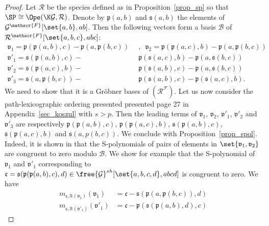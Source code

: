 \begin{proof}
Let $\mathcal{R}$ be the species defined as in Proposition~\ref{prop_sp} so that 
$\SP\cong\Ope(\K\mathcal{G},\mathcal{R})$. Denote by $\mathfrak{p}(a,b)$ and $\mathfrak{s}(a,b)$ the 
elements of $\mathcal{G}^{\mathscr{F}}[\set{a,b},ab]$. Then the following vectors form a basis 
$\mathcal{B}$ of $\mathcal{R}^{\mathscr{F}}[\set{a,b,c},abc]$:
\begin{align}
    \mathfrak{v}_1 =\mathfrak{p}(\mathfrak{p}(a,b),c) - \mathfrak{p}(a,\mathfrak{p}(b,c))  \enspace &,\enspace 
    \mathfrak{v}_2=\mathfrak{p}(\mathfrak{p}(a,c),b) - \mathfrak{p}(a,\mathfrak{p}(b,c))\label{vec_points}\\
    \mathfrak{v'}_1=\mathfrak{s}(\mathfrak{p}(a,b),c) - &\mathfrak{p}(\mathfrak{s}(a,c),b) - \mathfrak{p}(a,\mathfrak{s}(b,c)) \label{vec_seg1} \\
    \mathfrak{v'}_2=\mathfrak{s}(\mathfrak{p}(a,c),b) - &\mathfrak{p}(\mathfrak{s}(a,b),c) - \mathfrak{p}(a, \mathfrak{s}(b,c))  \label{vec_seg2}\\
    \mathfrak{v'}_3=\mathfrak{s}(a,\mathfrak{p}(b,c)) - &\mathfrak{p}(\mathfrak{s}(a,b),c) - \mathfrak{p}(\mathfrak{s}(a,c),b).\label{vec_seg3}
\end{align}
We need to show that it is a Gröbner bases of $(\mathcal{R}^{\mathscr{F}})$. Let us now consider the 
path-lexicographic ordering presented presented page 27 in Appendix~\ref{sec_koszul} with $s>p$. Then the leading terms 
of $\mathfrak{v}_1$, $\mathfrak{v}_2$, $\mathfrak{v'}_1$, $\mathfrak{v'}_2$ and $\mathfrak{v'}_3$ are 
respectively $\mathfrak{p}(\mathfrak{p}(a,b),c)$, $\mathfrak{p}(\mathfrak{p}(a,c),b)$, 
$\mathfrak{s}(\mathfrak{p}(a,b),c)$, $\mathfrak{s}(\mathfrak{p}(a,c),b)$ and $\mathfrak{s}(a,p(b,c))$. 
We conclude with Proposition~\ref{prop_spol}. Indeed, it is shown in \cite{DK10} that the S-polynomials of 
pairs of elements in $\set{\mathfrak{v}_1,\mathfrak{v}_2}$ are congruent to zero modulo $\mathcal{B}$. We 
show for example that the S-polynomial of $\mathfrak{v}_1$ and $\mathfrak{v'}_1$ corresponding to 
$\mathfrak{c}=\mathfrak{s}(\mathfrak{p}(\mathfrak{p}(a,b),c),d)\in\free{\mathcal{G}}^{sh}[\set{a,b,c,d},abcd]$ is congruent to zero. We have
\begin{equation}\begin{split}
    m_{\mathfrak{c},\text{lt}(\mathfrak{v}_1)}(\mathfrak{v}_1) &= \mathfrak{c}-\mathfrak{s}(\mathfrak{p}(a,\mathfrak{p}(b,c)),d)\\
    m_{\mathfrak{c},\text{lt}(\mathfrak{v'}_1)}(\mathfrak{v'}_1) &= \mathfrak{c} - \mathfrak{p}(\mathfrak{s}(\mathfrak{p}(a,b),d),c)

\end{split}
\end{equation}
\end{proof}
